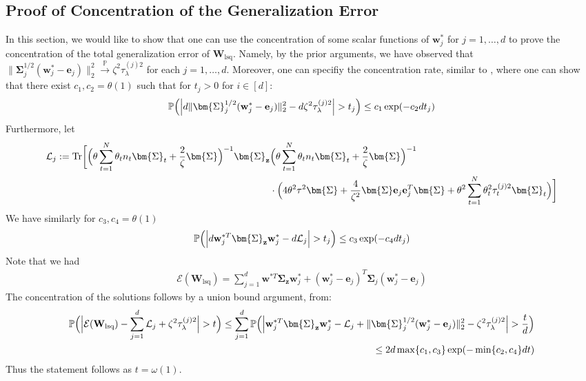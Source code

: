 \documentclass[final]{l4dc2026}
\newcommand{\bSigma}{\bm{\Sigma}}
\newcommand{\bW}{\mathbf{W}}
\newcommand{\be}{\mathbf{e}}
\newcommand{\bw}{\mathbf{w}}
\newcommand{\bz}{\mathbf{z}}
\newcommand{\bbP}{\mathbb{P}}
\newcommand{\calE}{\mathcal{E}}
\newcommand{\calL}{\mathcal{L}}
\newcommand{\tr}{\text{Tr}}
\newcommand{\rarrowp}{\xrightarrow[]{\bbP}}
\begin{document}
\subsection{Proof of Concentration of the Generalization Error}

In this section, we would like to show that one can use the concentration of some scalar functions of $\bw_{j}^{\ast}$ for $j = 1, \hdots, d$ to prove the concentration of the total generalization error of $\bW_{\text{lsq}}$. Namely, by the prior arguments, we have observed that $\|\bSigma_j^{1/2}(\bw^\ast_j-\be_j)\|^2_2 \rarrowp \zeta^2 \tau_{\lambda}^{(j)2}$ for each $j = 1, \hdots, d$. Moreover, one can specifiy the concentration rate, similar to \cite{dokmanic2019concentration, hassani2024curse}, where one can show that there exist $c_1, c_2= \theta(1)$ such that for $t_j > 0$ for $i\in [d]$:
\begin{align*}
    \bbP\Bigl(\Bigl|d \|\bSigma_j^{1/2}(\bw^\ast_j-\be_j)\|^2_2 - d\zeta^2 \tau_{\lambda}^{(j)2}  \Bigr| > t_j\Bigr) \le c_1 \exp(- c_2 d t_j)
\end{align*}
Furthermore, let
\begin{align*}
    \calL_j :=  \tr \biggl[ \Bigl(  \theta \sum_{t=1}^N \theta_t n_t \bSigma_t + \frac{2}{\zeta} \bSigma \Bigr)^{-1} \bSigma_{\bz}  &\Bigl(  \theta \sum_{t=1}^N \theta_t n_t \bSigma_t + \frac{2}{\zeta} \bSigma \Bigr)^{-1} \\
    &\cdot \Bigl( 4 \theta^2 \tau^2 \bSigma + \frac{4}{\zeta^2} \bSigma \be_j \be_j^T \bSigma + \theta^2 \sum_{t=1}^N \theta^2_t \tau^{(j)2}_t \bSigma_t \Bigr)\biggr]
\end{align*}
We have similarly for $c_3, c_4 = \theta(1)$
\begin{align*}
     \bbP\Bigl(\Bigl| d\bw^{\ast T}_j\bSigma_{\bz}\bw^\ast_j - d\calL_j  \Bigr| > t_j\Bigr) \le c_3 \exp(- c_4 d t_j)
\end{align*}
Note that we had
\begin{align*}
    \calE(\bW_{\text{lsq}}) = \sum_{j=1}^d \bw^{\ast T} \bSigma_{\bz} \bw_j^\ast + (\bw_j^\ast - \be_j)^T \bSigma_j (\bw_j^\ast - \be_j)
\end{align*}
The concentration of the solutions follows by a union bound argument, from:
\begin{align*}
    \bbP\Bigl(\Bigl| \calE(\bW_{\text{lsq}}) - \sum_{j=1}^d \calL_j + \zeta^2 \tau_{\lambda}^{(j)2} \Bigr| > t \Bigr) \le \sum_{j=1}^d \bbP\Bigl(\Bigl| \bw^{\ast T}_j\bSigma_{\bz}\bw^\ast_j - \calL_j +   \|\bSigma_j^{1/2}(\bw^\ast_j-\be_j)\|^2_2 - \zeta^2 \tau_{\lambda}^{(j)2} \Bigr| > \frac{t}{d} \Bigr) \\
    \le 2d \max\{c_1, c_3\} \exp(-\min\{c_2,c_4\}dt)
\end{align*}
Thus the statement follows as $t = \omega(1)$.
\end{document}
